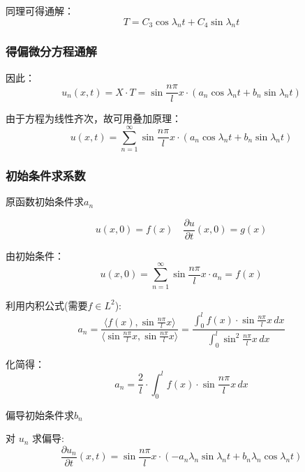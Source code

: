 \documentclass[12pt,a4paper]{article}
\numberwithin{subsection}{section}   %
\numberwithin{subsubsection}{subsection}
\theoremstyle{plain}
\theoremstyle{definition}
\theoremstyle{remark}
\theoremstyle{remark}
\begin{document}
	同理可得通解：
	\begin{equation}
		T = C_3 \cos \lambda_n t + C_4 \sin \lambda_n t
	\end{equation}
	
	\subsubsection{得偏微分方程通解}
	因此：
	\begin{equation}
		u_n(x, t) = X \cdot T = \sin \frac{n\pi}{l} x \cdot (a_n \cos \lambda_n t + b_n \sin \lambda_n t)
	\end{equation}
	
	由于方程为线性齐次，故可用叠加原理：
	\begin{equation}
		u(x, t) = \sum_{n=1}^{\infty} \sin \frac{n\pi}{l} x \cdot (a_n \cos \lambda_n t + b_n \sin \lambda_n t)
	\end{equation}
	
\subsubsection{初始条件求系数}
原函数初始条件求$a_n$
	
	\begin{equation}
		u(x, 0) = f(x) \quad \frac{\partial u}{\partial t}(x, 0) = g(x)
	\end{equation}
	
	由初始条件：
	\begin{equation}
		u(x, 0) = \sum_{n=1}^{\infty} \sin \frac{n\pi}{l} x \cdot a_n = f(x)
	\end{equation}
	
	利用内积公式(需要$f \in L^2$):
	\begin{equation}
		a_n = \frac{\langle f(x), \sin \frac{n\pi}{l} x \rangle}{\langle \sin \frac{n\pi}{l} x, \sin \frac{n\pi}{l} x \rangle} = \frac{\int_0^l f(x) \cdot \sin \frac{n\pi}{l} x \, dx}{\int_0^l \sin^2 \frac{n\pi}{l} x \, dx}
	\end{equation}
	
	化简得：
	\begin{equation}
		a_n = \frac{2}{l} \cdot \int_0^l f(x) \cdot \sin \frac{n\pi}{l} x \, dx
	\end{equation}
	
	偏导初始条件求$b_n$
	
	对 \(u_n\) 求偏导:
	\begin{equation}
		\frac{\partial u_n}{\partial t}(x, t) = \sin \frac{n\pi}{l} x \cdot \left( -a_n \lambda_n \sin \lambda_n t + b_n \lambda_n \cos \lambda_n t \right)
	\end{equation}
	
\end{document}
